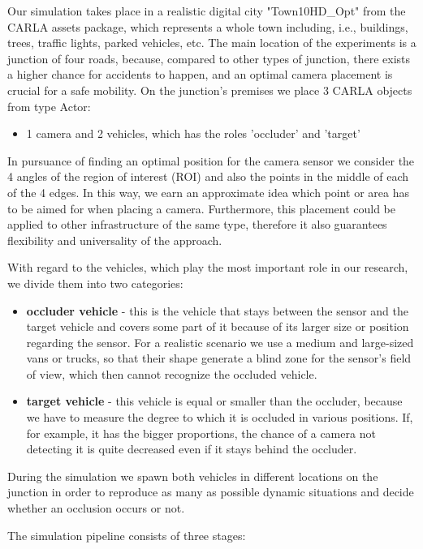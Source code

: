 Our simulation takes place in a realistic digital city "Town10HD\_Opt" from the CARLA assets package, which represents a whole town including, i.e., buildings, trees, traffic lights, parked vehicles, etc. The main location of the experiments is a junction of four roads, because, compared to other types of junction, there exists a higher chance for accidents to happen, and an optimal camera placement is crucial for a safe mobility. On the junction's premises we place 3 CARLA objects from type Actor: 
\begin{itemize}
    \item 1 camera and 2 vehicles, which has the roles 'occluder' and 'target'
\end{itemize}
In pursuance of finding an optimal position for the camera sensor we consider the 4 angles of the region of interest (ROI) and also the points in the middle of each of the 4 edges. In this way, we earn an approximate idea which point or area has to be aimed for when placing a camera. Furthermore, this placement could be applied to other infrastructure of the same type, therefore it also guarantees flexibility and universality of the approach. 

With regard to the vehicles, which play the most important role in our research, we divide them into two categories:

\begin{itemize}
    \item \textbf{occluder vehicle} - this is the vehicle that stays between the sensor and the target vehicle and covers some part of it because of its larger size or position regarding the sensor. For a realistic scenario we use a medium and large-sized vans or trucks, so that their shape generate a blind zone for the sensor's field of view, which then cannot recognize the occluded vehicle. 
    \item \textbf{target vehicle} - this vehicle is equal or smaller than the occluder, because we have to measure the degree to which it is occluded in various positions. If, for example, it has the bigger proportions, the chance of a camera not detecting it is quite decreased even if it stays behind the occluder. 
\end{itemize}
During the simulation we spawn both vehicles in different locations on the junction in order to reproduce as many as possible dynamic situations and decide whether an occlusion occurs or not. 

The simulation pipeline consists of three stages:

